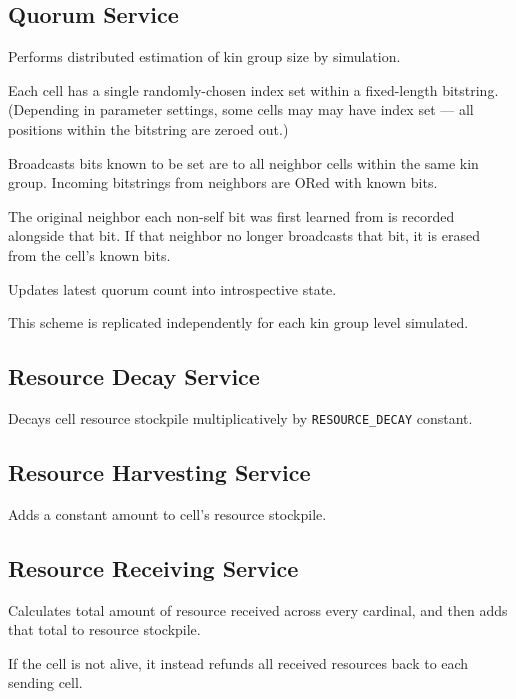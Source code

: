 \subsection{Quorum Service}


Performs distributed estimation of kin group size by simulation.

Each cell has a single randomly-chosen index set within a fixed-length bitstring.
(Depending in parameter settings, some cells may may have index set --- all positions within the bitstring are zeroed out.)

Broadcasts bits known to be set are to all neighbor cells within the same kin group.
Incoming bitstrings from neighbors are ORed with known bits.

The original neighbor each non-self bit was first learned from is recorded alongside that bit.
If that neighbor no longer broadcasts that bit, it is erased from the cell's known bits.

Updates latest quorum count into introspective state.

This scheme is replicated independently for each kin group level simulated.

\subsection{Resource Decay Service}


Decays cell resource stockpile multiplicatively by \texttt{RESOURCE\_DECAY} constant.

\subsection{Resource Harvesting Service}


Adds a constant amount to cell's resource stockpile.

\subsection{Resource Receiving Service}


Calculates total amount of resource received across every cardinal, and then adds that total to resource stockpile.

If the cell is not alive, it instead refunds all received resources back to each sending cell.

